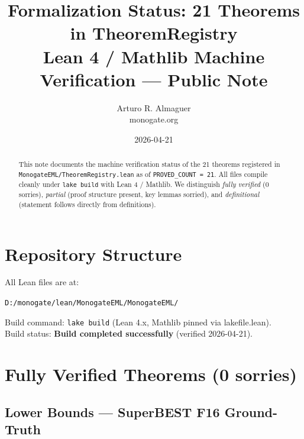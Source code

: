 \documentclass[11pt]{article}
\title{Formalization Status: 21 Theorems in TheoremRegistry\\
\large Lean 4 / Mathlib Machine Verification — Public Note}
\author{Arturo R. Almaguer \\ \small monogate.org}
\date{2026-04-21}
\begin{document}
\maketitle

\begin{abstract}
This note documents the machine verification status of the 21 theorems registered in
\texttt{MonogateEML/TheoremRegistry.lean} as of \texttt{PROVED\_COUNT = 21}. All files
compile cleanly under \texttt{lake build} with Lean 4 / Mathlib. We distinguish
\emph{fully verified} (0 sorries), \emph{partial} (proof structure present, key
lemmas sorried), and \emph{definitional} (statement follows directly from definitions).
\end{abstract}

\section{Repository Structure}

All Lean files are at:
\begin{center}
\texttt{D:/monogate/lean/MonogateEML/MonogateEML/}
\end{center}

\noindent Build command: \texttt{lake build} (Lean 4.x, Mathlib pinned via lakefile.lean).\\
Build status: \textbf{Build completed successfully} (verified 2026-04-21).

\section{Fully Verified Theorems (0 sorries)}

\subsection{Lower Bounds — SuperBEST F16 Ground-Truth}
\end{document}
